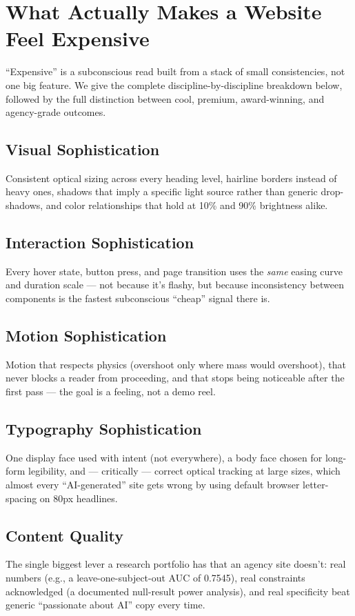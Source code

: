 \documentclass[conference]{IEEEtran}
\begin{document}
\section{What Actually Makes a Website Feel Expensive}

``Expensive'' is a subconscious read built from a stack of small consistencies, not one big feature. We give the complete discipline-by-discipline breakdown below, followed by the full distinction between cool, premium, award-winning, and agency-grade outcomes.

\subsection{Visual Sophistication}
Consistent optical sizing across every heading level, hairline borders instead of heavy ones, shadows that imply a specific light source rather than generic drop-shadows, and color relationships that hold at 10\% and 90\% brightness alike.

\subsection{Interaction Sophistication}
Every hover state, button press, and page transition uses the \emph{same} easing curve and duration scale --- not because it's flashy, but because inconsistency between components is the fastest subconscious ``cheap'' signal there is.

\subsection{Motion Sophistication}
Motion that respects physics (overshoot only where mass would overshoot), that never blocks a reader from proceeding, and that stops being noticeable after the first pass --- the goal is a feeling, not a demo reel.

\subsection{Typography Sophistication}
One display face used with intent (not everywhere), a body face chosen for long-form legibility, and --- critically --- correct optical tracking at large sizes, which almost every ``AI-generated'' site gets wrong by using default browser letter-spacing on 80px headlines.

\subsection{Content Quality}
The single biggest lever a research portfolio has that an agency site doesn't: real numbers (e.g., a leave-one-subject-out AUC of 0.7545), real constraints acknowledged (a documented null-result power analysis), and real specificity beat generic ``passionate about AI'' copy every time.
\end{document}
